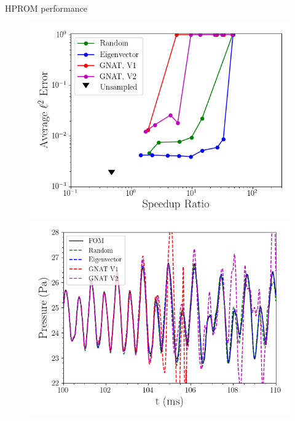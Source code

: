 \documentclass[]{beamer}
\begin{document}
\begin{frame}{HPROM performance}
	\begin{figure}
		\begin{minipage}{0.49\linewidth}
			\includegraphics[width=0.99\linewidth]{Images/experiments/2d_cavity/sampled_dt2p5e-6_Average_errorRaw_pareto.png}
		\end{minipage}
		\begin{minipage}{0.49\linewidth}
			\includegraphics[width=0.99\linewidth]{Images/experiments/2d_cavity/pressure_probe_deim_2p5.png}
		\end{minipage}
	\end{figure}
\end{frame}
\end{document}
